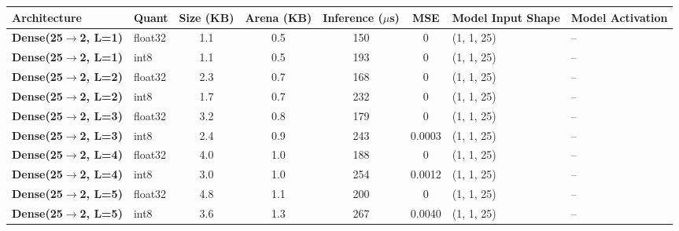 \begin{tabular}{llccccll}
\toprule
\textbf{Architecture} & Quant & Size (KB) & Arena (KB) & Inference ($\mu$s) & MSE & Model Input Shape & Model Activation \\
\midrule
\textbf{Dense(25$\to$2, L=1)} & float32 & 1.1 & 0.5 & 150 & 0 & (1, 1, 25) & -- \\
\textbf{Dense(25$\to$2, L=1)} & int8 & 1.1 & 0.5 & 193 & 0 & (1, 1, 25) & -- \\
\textbf{Dense(25$\to$2, L=2)} & float32 & 2.3 & 0.7 & 168 & 0 & (1, 1, 25) & -- \\
\textbf{Dense(25$\to$2, L=2)} & int8 & 1.7 & 0.7 & 232 & 0 & (1, 1, 25) & -- \\
\textbf{Dense(25$\to$2, L=3)} & float32 & 3.2 & 0.8 & 179 & 0 & (1, 1, 25) & -- \\
\textbf{Dense(25$\to$2, L=3)} & int8 & 2.4 & 0.9 & 243 & 0.0003 & (1, 1, 25) & -- \\
\textbf{Dense(25$\to$2, L=4)} & float32 & 4.0 & 1.0 & 188 & 0 & (1, 1, 25) & -- \\
\textbf{Dense(25$\to$2, L=4)} & int8 & 3.0 & 1.0 & 254 & 0.0012 & (1, 1, 25) & -- \\
\textbf{Dense(25$\to$2, L=5)} & float32 & 4.8 & 1.1 & 200 & 0 & (1, 1, 25) & -- \\
\textbf{Dense(25$\to$2, L=5)} & int8 & 3.6 & 1.3 & 267 & 0.0040 & (1, 1, 25) & -- \\
\bottomrule
\end{tabular}
